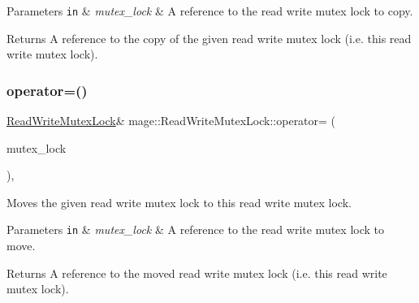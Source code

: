 \begin{DoxyParams}[1]{Parameters}
\mbox{\tt in}  & {\em mutex\+\_\+lock} & A reference to the read write mutex lock to copy. \\
\hline
\end{DoxyParams}
\begin{DoxyReturn}{Returns}
A reference to the copy of the given read write mutex lock (i.\+e. this read write mutex lock). 
\end{DoxyReturn}
\hypertarget{classmage_1_1_read_write_mutex_lock_aa9cd2de6983f8251d7494205bddce168}{}\label{classmage_1_1_read_write_mutex_lock_aa9cd2de6983f8251d7494205bddce168} 
\subsubsection{\texorpdfstring{operator=()}{operator=()}\hspace{0.1cm}{\footnotesize\ttfamily [2/2]}}
{\footnotesize\ttfamily \hyperlink{classmage_1_1_read_write_mutex_lock}{Read\+Write\+Mutex\+Lock}\& mage\+::\+Read\+Write\+Mutex\+Lock\+::operator= (\begin{DoxyParamCaption}\item[{\hyperlink{classmage_1_1_read_write_mutex_lock}{Read\+Write\+Mutex\+Lock} \&\&}]{mutex\+\_\+lock }\end{DoxyParamCaption})\hspace{0.3cm}{\ttfamily [default]}, {\ttfamily [noexcept]}}

Moves the given read write mutex lock to this read write mutex lock.


\begin{DoxyParams}[1]{Parameters}
\mbox{\tt in}  & {\em mutex\+\_\+lock} & A reference to the read write mutex lock to move. \\
\hline
\end{DoxyParams}
\begin{DoxyReturn}{Returns}
A reference to the moved read write mutex lock (i.\+e. this read write mutex lock). 
\end{DoxyReturn}
\hypertarget{classmage_1_1_read_write_mutex_lock_a25629916d6a73e930763c34aaa13c647}{}\label{classmage_1_1_read_write_mutex_lock_a25629916d6a73e930763c34aaa13c647} 
